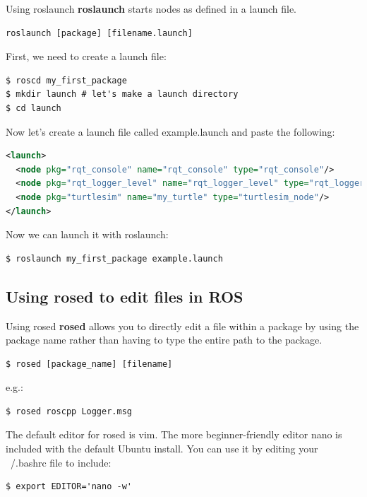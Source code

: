 \begin{frame}{Using roslaunch}
\textbf{roslaunch} starts nodes as defined in a launch file.

\begin{lstlisting}[language=syntax]
roslaunch [package] [filename.launch]
\end{lstlisting}

First, we need to create a launch file:
\begin{lstlisting}[language=shell]
$ roscd my_first_package
$ mkdir launch # let's make a launch directory
$ cd launch
\end{lstlisting}

Now let's create a launch file called example.launch and paste the following:
\begin{lstlisting}[language=xml]
<launch>
  <node pkg="rqt_console" name="rqt_console" type="rqt_console"/>
  <node pkg="rqt_logger_level" name="rqt_logger_level" type="rqt_logger_level"/>
  <node pkg="turtlesim" name="my_turtle" type="turtlesim_node"/>
</launch>
\end{lstlisting}
Now we can launch it with roslaunch:
\begin{lstlisting}[language=shell]
$ roslaunch my_first_package example.launch
\end{lstlisting}
\end{frame}

\subsection{Using rosed to edit files in ROS}

\begin{frame}[fragile]{Using rosed}
\textbf{rosed} allows you to directly edit a file within a package by using the package name rather than having to type the entire path to the package.

\begin{lstlisting}[language=syntax]
$ rosed [package_name] [filename]
\end{lstlisting}

e.g.:
\begin{lstlisting}[language=syntax]
$ rosed roscpp Logger.msg
\end{lstlisting}

The default editor for rosed is vim. The more beginner-friendly editor nano is included with the default Ubuntu install. You can use it by editing your ~/.bashrc file to include:

\begin{lstlisting}[language=shell]
$ export EDITOR='nano -w'
\end{lstlisting}
\end{frame}

